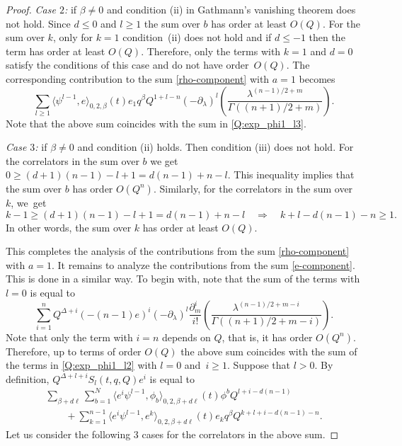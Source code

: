 \documentclass[10pt,a4paper]{article}
\numberwithin{equation}{section}
\begin{document}
\begin{proof}
{\em Case $2$:} if $\beta\neq 0$ and condition (ii) in Gathmann's vanishing theorem does not hold. Since ${d\leq 0}$ and $l\geq 1$ the sum over $b$ has order at least $O(Q)$. For the sum over $k$, only for $k=1$ condition~(ii) does not hold and if $d\leq -1$ then the term has order at least $O(Q)$. Therefore, only the terms with $k=1$ and $d=0$ satisfy the conditions of this case and do not have order~$O(Q)$. The corresponding contribution to the sum \eqref{rho-component} with $a=1$ becomes
\[
\sum_{l\geq 1}
\big\langle \psi^{l-1}, e\big\rangle_{0,2,\beta} (t) e_1 q^\beta Q^{1+l-n}
(-\partial_\lambda)^l
\left(
\frac{\lambda^{(n-1)/2+m}}{
\Gamma((n+1)/2+m)}
\right).
\]
Note that the above sum coincides with the sum in \eqref{Q:exp_phi1_l3}.

{\em Case $3$:} if $\beta\neq 0$ and condition (ii) holds. Then condition (iii) does not hold. For the correlators in the sum over $b$ we get $0\geq (d+1)(n-1) -l+1 =d(n-1) +n-l$. This inequality implies that the sum over $b$ has order $O(Q^n)$. Similarly, for the correlators in the sum over~$k$, we~get
\[
k-1\geq (d+1)(n-1)-l+1 = d(n-1)+n-l\quad
\Rightarrow \quad
k+l-d(n-1) -n \geq 1.
\]
In other words, the sum over $k$ has order at least $O(Q)$.

This completes the analysis of the contributions from the sum \eqref{rho-component} with $a=1$. It remains to analyze the contributions from the sum \eqref{e-component}. This is done in a similar way. To begin with, note that the sum of the terms with $l=0$ is equal to
\[
\sum_{i=1}^n Q^{\Delta+i}(-(n-1)e)^i
(-\partial_\lambda)^l
\frac{\partial_m^i}{i!}
\left(
\frac{\lambda^{(n-1)/2+m-i}}{
\Gamma((n+1)/2+m-i)}
\right).
\]
Note that only the term with $i=n$ depends on $Q$, that is, it has order $O(Q^n)$. Therefore, up to terms of order $O(Q)$ the above sum coincides with the sum of the terms in \eqref{Q:exp_phi1_l2} with $l=0$ and~$i\geq 1$. Suppose that $l>0$. By definition, $Q^{\Delta+l+i}S_l(t,q,Q)e^i$ is equal to
\begin{gather*}%
\sum_{\beta+d\ell }
\sum_{b=1}^N
\big\langle e^i\psi^{l-1},\phi_b\big\rangle_{0,2,\beta+d\ell} (t) \phi^b Q^{l+i-d(n-1)} \\
\qquad{} +
\sum_{k=1}^{n-1}
\big\langle e^i \psi^{l-1}, e^k\big\rangle_{0,2,\beta+d\ell} (t) e_k q^\beta Q^{k+l+i-d(n-1)-n}.
\end{gather*}
Let us consider the following 3 cases for the correlators in the above sum.


\end{proof}
\end{document}
